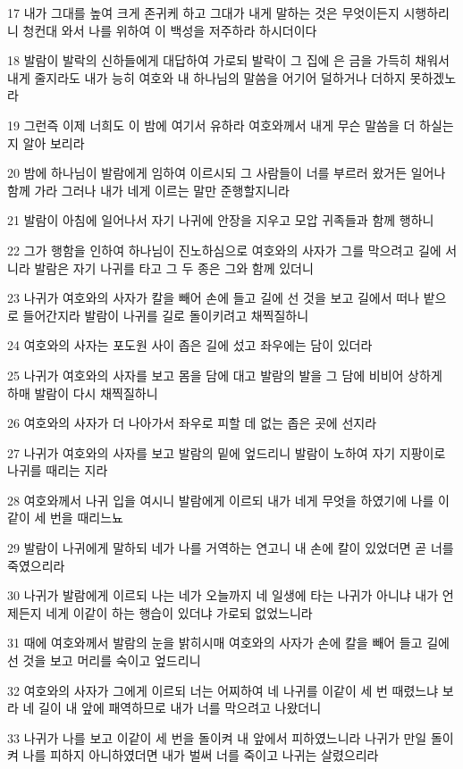 \par 17 내가 그대를 높여 크게 존귀케 하고 그대가 내게 말하는 것은 무엇이든지 시행하리니 청컨대 와서 나를 위하여 이 백성을 저주하라 하시더이다
\par 18 발람이 발락의 신하들에게 대답하여 가로되 발락이 그 집에 은 금을 가득히 채워서 내게 줄지라도 내가 능히 여호와 내 하나님의 말씀을 어기어 덜하거나 더하지 못하겠노라
\par 19 그런즉 이제 너희도 이 밤에 여기서 유하라 여호와께서 내게 무슨 말씀을 더 하실는지 알아 보리라
\par 20 밤에 하나님이 발람에게 임하여 이르시되 그 사람들이 너를 부르러 왔거든 일어나 함께 가라 그러나 내가 네게 이르는 말만 준행할지니라
\par 21 발람이 아침에 일어나서 자기 나귀에 안장을 지우고 모압 귀족들과 함께 행하니
\par 22 그가 행함을 인하여 하나님이 진노하심으로 여호와의 사자가 그를 막으려고 길에 서니라 발람은 자기 나귀를 타고 그 두 종은 그와 함께 있더니
\par 23 나귀가 여호와의 사자가 칼을 빼어 손에 들고 길에 선 것을 보고 길에서 떠나 밭으로 들어간지라 발람이 나귀를 길로 돌이키려고 채찍질하니
\par 24 여호와의 사자는 포도원 사이 좁은 길에 섰고 좌우에는 담이 있더라
\par 25 나귀가 여호와의 사자를 보고 몸을 담에 대고 발람의 발을 그 담에 비비어 상하게 하매 발람이 다시 채찍질하니
\par 26 여호와의 사자가 더 나아가서 좌우로 피할 데 없는 좁은 곳에 선지라
\par 27 나귀가 여호와의 사자를 보고 발람의 밑에 엎드리니 발람이 노하여 자기 지팡이로 나귀를 때리는 지라
\par 28 여호와께서 나귀 입을 여시니 발람에게 이르되 내가 네게 무엇을 하였기에 나를 이같이 세 번을 때리느뇨
\par 29 발람이 나귀에게 말하되 네가 나를 거역하는 연고니 내 손에 칼이 있었더면 곧 너를 죽였으리라
\par 30 나귀가 발람에게 이르되 나는 네가 오늘까지 네 일생에 타는 나귀가 아니냐 내가 언제든지 네게 이같이 하는 행습이 있더냐 가로되 없었느니라
\par 31 때에 여호와께서 발람의 눈을 밝히시매 여호와의 사자가 손에 칼을 빼어 들고 길에 선 것을 보고 머리를 숙이고 엎드리니
\par 32 여호와의 사자가 그에게 이르되 너는 어찌하여 네 나귀를 이같이 세 번 때렸느냐 보라 네 길이 내 앞에 패역하므로 내가 너를 막으려고 나왔더니
\par 33 나귀가 나를 보고 이같이 세 번을 돌이켜 내 앞에서 피하였느니라 나귀가 만일 돌이켜 나를 피하지 아니하였더면 내가 벌써 너를 죽이고 나귀는 살렸으리라
